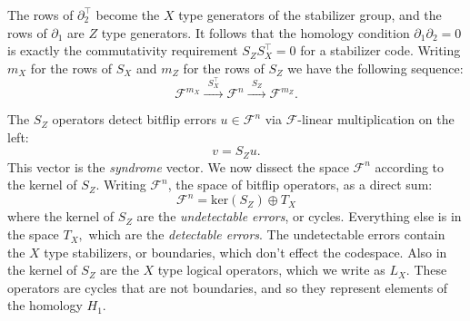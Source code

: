 \documentclass[11pt,oneside]{report}
\newcommand{\Field}{\mathcal{F}}
\def\Ker{\mathrm{ker}}
\begin{document}

The rows of $\partial_2^\top$ become the $X$ type generators of
the stabilizer group, and the rows of $\partial_1$ are $Z$ type
generators.
It follows that 
the homology condition $\partial_1\partial_2 = 0$ is
exactly the commutativity requirement $S_Z S_X^\top = 0$ for
a stabilizer code.
Writing $m_X$ for the rows of $S_X$ and $m_Z$ for the rows
of $S_Z$ we have the following sequence:
\begin{equation}\label{eq:homology}
    \Field^{m_X} \xrightarrow{\ \ S_X^\top\ \ } 
    \Field^{n} \xrightarrow{\ \ S_Z\ \ } 
    \Field^{m_Z}.
\end{equation}

The $S_Z$ operators detect bitflip errors $u\in\Field^n$
via $\Field$-linear multiplication on the left:
$$
    v = S_Zu.
$$
This vector is the \emph{syndrome} vector.
We now dissect the space $\Field^n$ according to the kernel of $S_Z$.
Writing $\Field^n$, the space of bitflip operators,
as a direct sum:
$$
    \Field^n = \Ker(S_Z) \oplus T_X
$$
where the kernel of $S_Z$ are the \emph{undetectable errors}, or cycles.
Everything else is in 
the space $T_X,$ which are the \emph{detectable errors}.
The undetectable errors contain the $X$ type stabilizers, or boundaries,
which don't effect the codespace.
Also in the kernel of $S_Z$ are the $X$ type logical operators, which 
we write as $L_X.$
These operators are cycles that are not boundaries, and so they represent
elements of the homology $H_1.$
\end{document}

